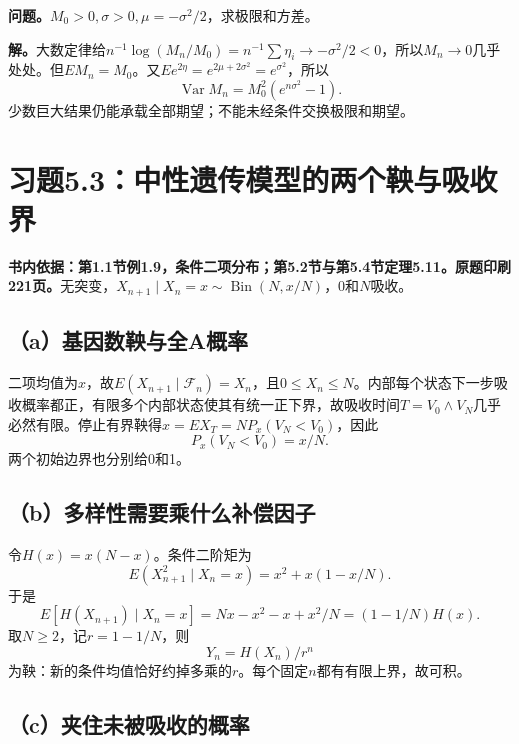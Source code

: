 \documentclass[11pt,a4paper,UTF8,fontset=fandol]{ctexart}
\begin{document}
\textbf{问题。}\(M_0>0,\sigma>0,\mu=-\sigma^2/2\)，求极限和方差。

\textbf{解。}大数定律给\(n^{-1}\log(M_n/M_0)=n^{-1}\sum\eta_i\to-\sigma^2/2<0\)，所以\(M_n\to0\)几乎处处。但\(EM_n=M_0\)。又\(Ee^{2\eta}=e^{2\mu+2\sigma^2}=e^{\sigma^2}\)，所以
\[\boxed{\operatorname{Var}M_n=M_0^2(e^{n\sigma^2}-1).}\]
少数巨大结果仍能承载全部期望；不能未经条件交换极限和期望。

\bigskip

\section{习题5.3：中性遗传模型的两个鞅与吸收界}\label{ux4e60ux98985.3ux4e2dux6027ux9057ux4f20ux6a21ux578bux7684ux4e24ux4e2aux9785ux4e0eux5438ux6536ux754c}

\textbf{书内依据：第1.1节例1.9，条件二项分布；第5.2节与第5.4节定理5.11。原题印刷221页。}无突变，\(X_{n+1}\mid X_n=x\sim\operatorname{Bin}(N,x/N)\)，0和\(N\)吸收。

\subsection{（a）基因数鞅与全A概率}\label{aux57faux56e0ux6570ux9785ux4e0eux5168aux6982ux7387}

二项均值为\(x\)，故\(E(X_{n+1}\mid\mathcal F_n)=X_n\)，且\(0\le X_n\le N\)。内部每个状态下一步吸收概率都正，有限多个内部状态使其有统一正下界，故吸收时间\(T=V_0\wedge V_N\)几乎必然有限。停止有界鞅得\(x=EX_T=N P_x(V_N<V_0)\)，因此
\[\boxed{P_x(V_N<V_0)=x/N.}\] 两个初始边界也分别给0和1。

\subsection{（b）多样性需要乘什么补偿因子}\label{bux591aux6837ux6027ux9700ux8981ux4e58ux4ec0ux4e48ux8865ux507fux56e0ux5b50}

令\(H(x)=x(N-x)\)。条件二阶矩为 \[E(X_{n+1}^2\mid X_n=x)=x^2+x(1-x/N).\]
于是 \[E[H(X_{n+1})\mid X_n=x]
=Nx-x^2-x+x^2/N=(1-1/N)H(x).\] 取\(N\ge2\)，记\(r=1-1/N\)，则
\[\boxed{Y_n=H(X_n)/r^n}\]
为鞅：新的条件均值恰好约掉多乘的\(r\)。每个固定\(n\)都有有限上界，故可积。

\subsection{（c）夹住未被吸收的概率}\label{cux5939ux4f4fux672aux88abux5438ux6536ux7684ux6982ux7387}
\end{document}
